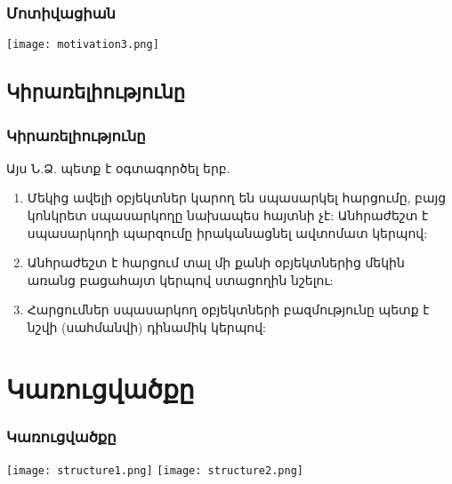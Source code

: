 \documentclass{beamer}
\begin{document}
\begin{frame}\frametitle{Մոտիվացիան}
\begin{center}
    \texttt{[image: motivation3.png]}
\end{center}
\end{frame}

\subsection{Կիրառելիությունը}
\begin{frame}\frametitle{Կիրառելիությունը}
Այս Ն.Ձ. պետք է օգտագործել երբ.
\vfill
\begin{enumerate}
    \scriptsize
    \item Մեկից ավելի օբյեկտներ կարող են սպասարկել հարցումը, բայց կոնկրետ
    սպասարկողը նախապես հայտնի չէ: Անհրաժեշտ է սպասարկողի պարզումը
    իրականացնել ավտոմատ կերպով: \pause \vfill
    \item Անհրաժեշտ է հարցում տալ մի քանի օբյեկտներից մեկին առանց բացահայտ
    կերպով ստացողին նշելու: \pause \vfill
    \item Հարցումներ սպասարկող օբյեկտների բազմությունը պետք է նշվի (սահմանվի)
    դինամիկ կերպով:
\end{enumerate}
\end{frame}

\section{Կառուցվածքը}
\begin{frame}\frametitle{Կառուցվածքը}
\begin{center}
    \texttt{[image: structure1.png]}
    \texttt{[image: structure2.png]}
\end{center}
\end{frame}
\end{document}

